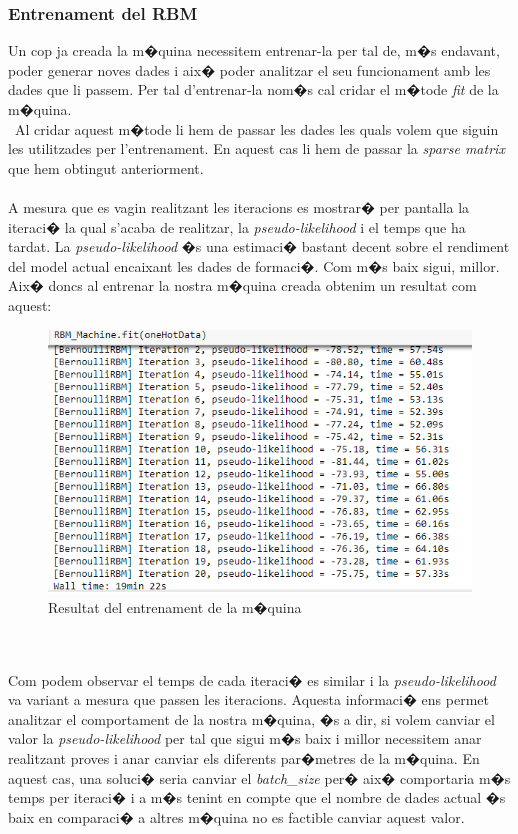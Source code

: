 \documentclass[12pt,a4paper,openright,oneside]{article}
\numberwithin{equation}{section}
\theoremstyle{definition}
\begin{document}
\subsubsection{Entrenament del RBM}
Un cop ja creada la m�quina necessitem entrenar-la per tal de, m�s endavant, poder generar noves dades i aix� poder analitzar el seu funcionament amb les dades que li passem. Per tal d'entrenar-la nom�s cal cridar el m�tode \textit{fit} de la m�quina.\\\
Al cridar aquest m�tode li hem de passar les dades les quals volem que siguin les utilitzades per l'entrenament. En aquest cas li hem de passar la \textit{sparse matrix} que hem obtingut anteriorment. \\\\
A mesura que es vagin realitzant les iteracions es mostrar� per pantalla la iteraci� la qual s'acaba de realitzar, la \textit{pseudo-likelihood} i el temps que ha tardat. La \textit{pseudo-likelihood} �s una estimaci� bastant decent sobre el rendiment del model actual encaixant les dades de formaci�. Com m�s baix sigui, millor. Aix� doncs al entrenar la nostra m�quina creada obtenim un resultat com aquest:
\begin{figure}[h!]
\begin{center}
\includegraphics[width=\textwidth]{rbmtrain}
\caption{Resultat del entrenament de la m�quina}
\end{center}
\end{figure}
\\\\
Com podem observar el temps de cada iteraci� es similar i la \textit{pseudo-likelihood} va variant a mesura que passen les iteracions. Aquesta informaci� ens permet analitzar el comportament de la nostra m�quina, �s a dir, si volem canviar el valor la \textit{pseudo-likelihood} per tal que sigui m�s baix i millor necessitem anar realitzant proves i anar canviar els diferents par�metres de la m�quina. En aquest cas, una soluci� seria canviar el \textit{batch\_size} per� aix� comportaria m�s temps per iteraci� i a m�s tenint en compte que el nombre de dades actual �s baix en comparaci� a altres m�quina no es factible canviar aquest valor. \\\\
\end{document}
